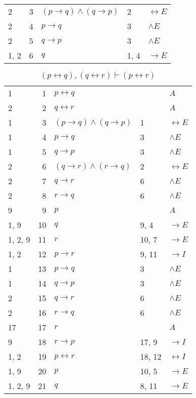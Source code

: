 \documentclass{article}
\begin{document}
\begin{table}[htbp]
\begin{tabular}{lrlll}
{2} & 3 & $(p→q)∧(q→p)$ & {2} & $↔E$ \\
{2} & 4 & $p→q$ & {3} & $∧E$ \\
{2} & 5 & $q→p$ & {3} & $∧E$ \\
{1, 2} & 6 & $q$ & {1, 4} & $→E$ \\
\end{tabular}
\end{table}\begin{table}[htbp]\caption*{$(p↔q),(q↔r) ⊢ (p↔r)$}\centering\begin{tabular}{lrlll}
{1} & 1 & $p↔q$ & {} & $A$ \\
{2} & 2 & $q↔r$ & {} & $A$ \\
{1} & 3 & $(p→q)∧(q→p)$ & {1} & $↔E$ \\
{1} & 4 & $p→q$ & {3} & $∧E$ \\
{1} & 5 & $q→p$ & {3} & $∧E$ \\
{2} & 6 & $(q→r)∧(r→q)$ & {2} & $↔E$ \\
{2} & 7 & $q→r$ & {6} & $∧E$ \\
{2} & 8 & $r→q$ & {6} & $∧E$ \\
{9} & 9 & $p$ & {} & $A$ \\
{1, 9} & 10 & $q$ & {9, 4} & $→E$ \\
{1, 2, 9} & 11 & $r$ & {10, 7} & $→E$ \\
{1, 2} & 12 & $p→r$ & {9, 11} & $→I$ \\
{1} & 13 & $p→q$ & {3} & $∧E$ \\
{1} & 14 & $q→p$ & {3} & $∧E$ \\
{2} & 15 & $q→r$ & {6} & $∧E$ \\
{2} & 16 & $r→q$ & {6} & $∧E$ \\
{17} & 17 & $r$ & {} & $A$ \\
{9} & 18 & $r→p$ & {17, 9} & $→I$ \\
{1, 2} & 19 & $p↔r$ & {18, 12} & $↔I$ \\
{1, 9} & 20 & $p$ & {10, 5} & $→E$ \\
{1, 2, 9} & 21 & $q$ & {8, 11} & $→E$ \\
\end{tabular}
\end{table}
\end{document}
